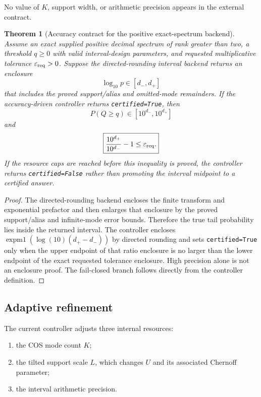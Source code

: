 \documentclass[11pt]{article}
\newtheorem{theorem}{Theorem}[section]
\theoremstyle{definition}
\theoremstyle{remark}
\begin{document}
No value of \(K\), support width, or arithmetic precision appears in the
external contract.

\begin{theorem}[Accuracy contract for the positive exact-spectrum backend]\label{claim:final-5-1}
Assume an exact supplied positive decimal spectrum of rank greater than two,
a threshold \(q\ge0\) with valid interval-design parameters, and requested multiplicative tolerance
\(\varepsilon_{\rm req}>0\).  Suppose the directed-rounding interval backend
returns an enclosure
\[
\log_{10}p\in[d_-,d_+]
\]
that includes the proved support/alias and omitted-mode remainders.  If the
accuracy-driven controller returns \texttt{certified=True}, then
\[
\boxed{
P(Q\ge q)\in[10^{d_-},10^{d_+}]
}
\]
and
\[
\boxed{
\frac{10^{d_+}}{10^{d_-}}-1
\le
\varepsilon_{\rm req}.
}
\]
If the resource caps are reached before this inequality is proved, the
controller returns \texttt{certified=False} rather than promoting the interval
midpoint to a certified answer.
\end{theorem}

\begin{proof}
The directed-rounding backend encloses the finite transform and exponential
prefactor and then enlarges that enclosure by the proved support/alias and
infinite-mode error bounds.  Therefore the true tail probability lies inside
the returned interval.  The controller encloses
\(\operatorname{expm1}(\log(10)(d_+-d_-))\) by directed rounding and
sets \texttt{certified=True} only when the upper endpoint of that ratio
enclosure is no larger than the lower endpoint of the exact requested
tolerance enclosure.  High precision alone is not an enclosure proof.  The fail-closed branch follows directly from
the controller definition.
\end{proof}

\subsection{Adaptive refinement}

The current controller adjusts three internal resources:

\begin{enumerate}
\item the COS mode count \(K\);
\item the tilted support scale \(L\), which changes \(U\) and its associated
Chernoff parameter;
\item the interval arithmetic precision.
\end{enumerate}
\end{document}
